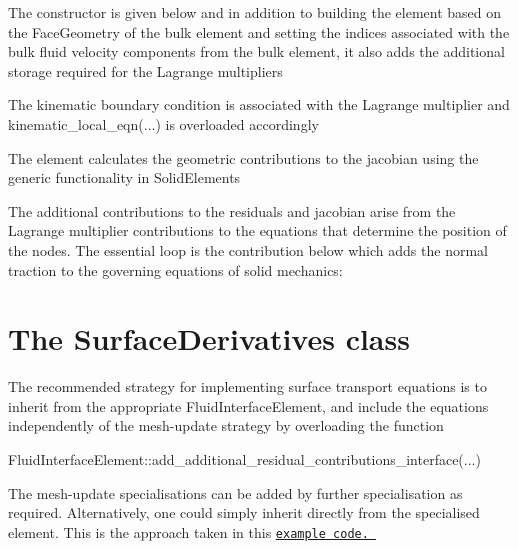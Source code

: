 The constructor is given below and in addition to building the element based on the {\ttfamily Face\+Geometry} of the bulk element and setting the indices associated with the bulk fluid velocity components from the bulk element, it also adds the additional storage required for the Lagrange multipliers

 
\begin{DoxyCodeInclude}

\end{DoxyCodeInclude}


The kinematic boundary condition is associated with the Lagrange multiplier and {\ttfamily kinematic\+\_\+local\+\_\+eqn}(...) is overloaded accordingly  
\begin{DoxyCodeInclude}

\end{DoxyCodeInclude}


The element calculates the geometric contributions to the jacobian using the generic functionality in {\ttfamily Solid\+Elements} 
\begin{DoxyCodeInclude}

\end{DoxyCodeInclude}


The additional contributions to the residuals and jacobian arise from the Lagrange multiplier contributions to the equations that determine the position of the nodes. The essential loop is the contribution below which adds the normal traction to the governing equations of solid mechanics\+: 
\begin{DoxyCodeInclude}

\end{DoxyCodeInclude}
\hypertarget{index_surface}{}\section{The Surface\+Derivatives class}\label{index_surface}
The recommended strategy for implementing surface transport equations is to inherit from the appropriate {\ttfamily Fluid\+Interface\+Element}, and include the equations independently of the mesh-\/update strategy by overloading the function 
\begin{DoxyCode}
FluidInterfaceElement::add\_additional\_residual\_contributions\_interface(...)
\end{DoxyCode}
 The mesh-\/update specialisations can be added by further specialisation as required. Alternatively, one could simply inherit directly from the specialised element. This is the approach taken in this \href{../../../multi_physics/rayleigh_instability_surfactant/html/index.html}{\tt example code. }

